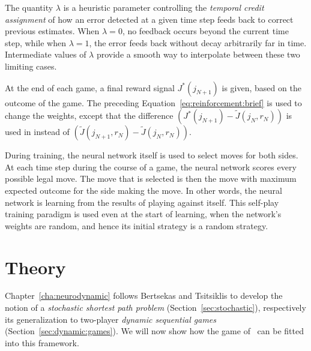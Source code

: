The quantity $\lambda$ is a heuristic parameter controlling the \emph{temporal credit assignment} of how an error detected at a given time step feeds back to correct previous estimates. When $\lambda=0$, no feedback occurs beyond the current time step, while when $\lambda=1$, the error feeds back without decay arbitrarily far in time. Intermediate values of $\lambda$ provide a smooth way to interpolate between these two limiting cases.

At the end of each game, a final reward signal $J^*(j_{N+1})$ is given, based on the outcome of the game. The preceding Equation~\ref{eq:reinforcement:brief} is used to change the weights, except that the difference $\left(J^*(j_{N+1}) - \tilde J(j_{N},r_{N})\right)$ is used in instead of $\left(\tilde J(j_{N+1},r_{N}) - \tilde J(j_{N},r_{N})\right)$.

During training, the neural network itself is used to select moves for both sides. At each time step during the course of a game, the neural network scores every possible legal move. The move that is selected is then the move with maximum expected outcome for the side making the move. In other words, the neural network is learning from the results of playing against itself. This self-play training paradigm is used even at the start of learning, when the network's weights are random, and hence its initial strategy is a random strategy.






\section{Theory} \label{sec:impl:theory} 
Chapter~\ref{cha:neurodynamic} follows Bertsekas and Tsitsiklis \cite{Bertsekas96} to develop the notion of a \emph{stochastic shortest path problem} (Section~\ref{sec:stochastic}), respectively its generalization to two-player \emph{dynamic sequential games} (Section~\ref{sec:dynamic:games}). We will now show how the game of \Abalone\ can be fitted into this framework.

